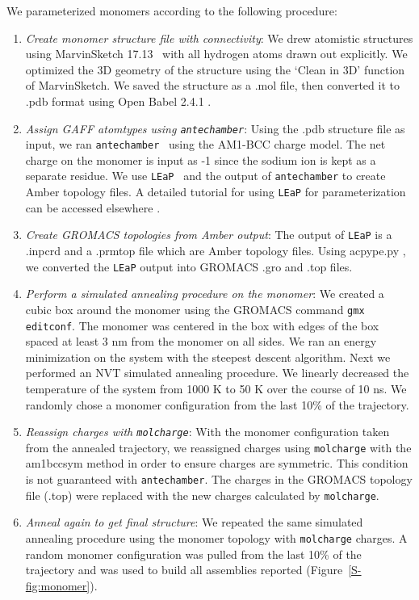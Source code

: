   We parameterized monomers according to the following procedure:
  \begin{enumerate}
  
	\item \textit{Create monomer structure file with connectivity}: We
	drew atomistic structures using MarvinSketch
	17.13~\cite{chemaxon_marvinsketch_2017} with all hydrogen atoms drawn out
	explicitly. We optimized the 3D geometry of the structure using the `Clean in
	3D' function of MarvinSketch.  We saved the structure as a .mol file, then
	converted it to .pdb format using Open Babel 2.4.1
	\cite{oboyle_open_2011,noauthor_open_nodate}. 
	
	\item \textit{Assign GAFF atomtypes using \texttt{antechamber}}: Using
	the .pdb structure file as input, we ran
	\texttt{antechamber}~\cite{wang_automatic_2006} using the AM1-BCC charge model.
	The net charge on the monomer is input as -1 since the sodium ion is kept as 
	a separate residue. We use \texttt{LEaP}~\cite{case_ambertools16_2016} and the
	output of \texttt{antechamber} to create Amber topology files. A detailed
	tutorial for using \texttt{LEaP} for parameterization can be accessed elsewhere \cite{walker_antechamber_nodate}.

	\item \textit{Create GROMACS topologies from Amber output}: The output
	of \texttt{LEaP} is a .inpcrd and a .prmtop file which are Amber topology
	files. Using acpype.py \cite{sousa_da_silva_acpype_2012}, we converted the
	\texttt{LEaP} output into GROMACS .gro and .top files. 

	\item \textit{Perform a simulated annealing procedure on the monomer}:
	We created a cubic box around the monomer using the GROMACS command \texttt{gmx
	editconf}. The monomer was centered in the box with edges of the
	box spaced at least 3 nm from the monomer on all sides. We ran an energy minimization
	on the system with the steepest descent algorithm. Next we performed an NVT
	simulated annealing procedure. We linearly decreased the temperature of the
	system from 1000 K to 50 K over the course of 10 ns. We randomly chose a monomer
	configuration from the last 10\% of the trajectory. 

	\item \textit{Reassign charges with \texttt{molcharge}}: With the monomer
	configuration taken from the annealed trajectory, we reassigned charges using
	\texttt{molcharge} with the am1bccsym method in order to ensure charges 
	are symmetric. This condition is not guaranteed with \texttt{antechamber}. 
	The charges in the GROMACS topology file (.top) were replaced with the 
	new charges calculated by \texttt{molcharge}. 

	\item \textit{Anneal again to get final structure}: We repeated the
	same simulated annealing procedure using the monomer topology with
	\texttt{molcharge} charges. A random monomer configuration was pulled from the
	last 10\% of the trajectory and was used to build all assemblies reported
	(Figure~\ref{S-fig:monomer}).
	
  \end{enumerate} 

